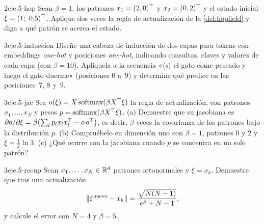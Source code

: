 \begin{ejercicio}{2}{eje:5-hop}
Sean $\beta=1$, los patrones $x_1=(2,0)^{\top}$ y $x_2=(0,2)^{\top}$ y el estado inicial $\xi=(1;\allowbreak\ 0{,}5)^{\top}$. Aplique dos veces la regla de actualización de la \cref{def:hopfield} y diga a qué patrón se acerca el estado.
\end{ejercicio}

\begin{ejercicio}{3}{eje:5-induccion}
Diseñe una cabeza de inducción de dos capas para tokens con embeddings \emph{one-hot} y posiciones \emph{one-hot}, indicando consultas, claves y valores de cada capa (con $\beta=10$). Aplíquela a la secuencia «$\langle s\rangle$ el gato come pescado y luego el gato duerme» (posiciones $0$ a~$9$) y determine qué predice en las posiciones~7, 8 y~9.
\end{ejercicio}

\begin{ejercicio}{3}{eje:5-jac}
Sea $o(\xi)=X\operatorname{softmax}(\beta X^{\top}\xi)$ la regla de actualización, con patrones $x_1,\dots,x_N$ y pesos $p=\operatorname{softmax}(\beta X^{\top}\xi)$. (a) Demuestre que su jacobiana es $\partial o/\partial\xi=\beta\bigl(\sum_lp_lx_lx_l^{\top}-o\,o^{\top}\bigr)$, es decir, $\beta$ veces la covarianza de los patrones bajo la distribución $p$. (b) Compruébelo en dimensión uno con $\beta=1$, patrones $0$ y $2$ y $\xi=\tfrac12\ln 3$. (c) ¿Qué ocurre con la jacobiana cuando $p$ se concentra en un solo patrón?
\end{ejercicio}

\begin{ejercicio}{3}{eje:5-recup}
Sean $x_1,\dots,x_N\in\mathbb{R}^{d}$ patrones ortonormales y $\xi=x_k$. Demuestre que tras una actualización
\[
\lVert\xi^{\text{nuevo}}-x_k\rVert=\frac{\sqrt{N(N-1)}}{e^{\beta}+N-1},
\]
y calcule el error con $N=4$ y $\beta=5$.
\end{ejercicio}
